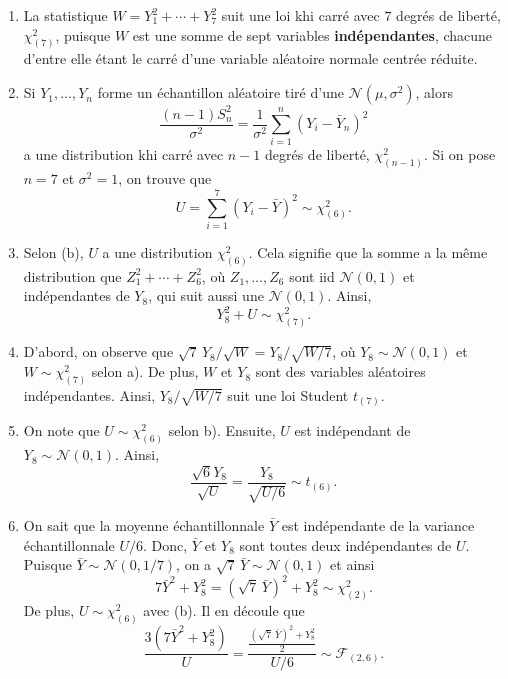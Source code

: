\begin{solution}{2.4}
\begin{enumerate}
\item La statistique $W = Y_1^2 + \cdots + Y^2_7$ suit une loi khi carré avec $7$ degrés de liberté, $\chi^2_{(7)}$, puisque $W$ est une somme de sept variables \textbf{indépendantes}, chacune d'entre elle étant le carré d'une variable aléatoire normale centrée réduite.

\item Si $Y_1, \ldots , Y_n$ forme un échantillon aléatoire tiré d'une $\mathcal{N}(\mu, \sigma^2)$, alors
$$
\frac{(n-1)S^2_n}{\sigma^2} = \frac{1}{\sigma^2} \sum_{i=1}^n (Y_i - {\bar Y}_n)^2
$$
a une distribution khi carré avec $n-1$ degrés de liberté, $\chi^2_{(n-1)}$. Si on pose $n=7$ et $\sigma^2 =1$, on trouve que
$$
U = \sum_{i=1}^7 (Y_i - {\bar Y})^2 \sim \chi^2_{(6)}.
$$

\item Selon (b), $U$ a une distribution $\chi^2_{(6)}$. Cela signifie que la somme a la même distribution que $Z_1^2 + \cdots + Z_6^2$, où $Z_1, \ldots , Z_6$ sont iid $\mathcal{N}(0,1)$ et indépendantes de $Y_8$, qui suit aussi une $\mathcal{N}(0,1)$. Ainsi,
$$
Y_8^2 +U \sim \chi^2_{(7)}.
$$

\item
D'abord, on observe que $\sqrt{7} \, Y_8 /\sqrt{W} = Y_8/\sqrt{W/7}$, où $Y_8 \sim \mathcal{N}(0,1)$ et $W \sim \chi^2_{(7)}$ selon a). De plus, $W$ et $Y_8$ sont des variables aléatoires indépendantes. Ainsi, $Y_8/\sqrt{W/7}$ suit une loi Student $t_{(7)}$.

\item On note que $U \sim \chi^2_{(6)}$ selon b). Ensuite, $U$ est indépendant de $Y_8 \sim \mathcal{N}(0,1)$. Ainsi,
$$
\frac{\sqrt{6}Y_8}{\sqrt{U}} = \frac{Y_8}{\sqrt{U/6}} \sim t_{(6)}.
$$

\item On sait que la moyenne échantillonnale ${\bar Y}$ est indépendante de la variance échantillonnale $U/6$. Donc, ${\bar Y}$ et $Y_8$ sont toutes deux indépendantes de $U$. Puisque ${\bar Y} \sim \mathcal{N}(0,1/7)$, on a $\sqrt{7} \, {\bar Y} \sim \mathcal{N}(0,1)$ et ainsi
$$
7{\bar Y}^2 + Y^2_8 = (\sqrt{7} \, {\bar Y})^2 + Y^2_8 \sim \chi^2_{(2)}.
$$
De plus, $U \sim \chi^2_{(6)}$ avec (b). Il en découle que
$$
\frac{3(7{\bar Y}^2 + Y^2_8)}{U} = \frac{\displaystyle \frac{(\sqrt{7} \, {\bar Y})^2+Y^2_8}{2}}{U/6} \sim \mathcal{F}_{(2,6)}.
$$
\end{enumerate}
\end{solution}
